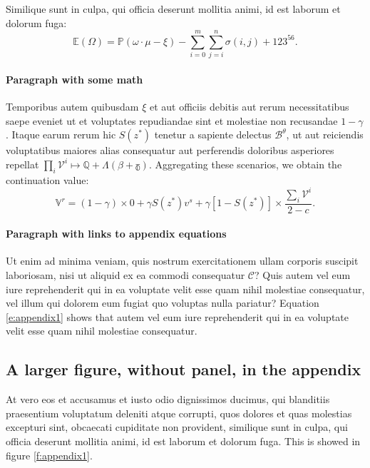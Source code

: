 \documentclass[letterpaper,12pt,leqno]{article}
\begin{document}
\begin{corollary} Similique sunt in culpa, qui officia deserunt mollitia animi, id est laborum et dolorum fuga:
\begin{equation*}
\mathbb{E}(\Omega) = \mathbb{P}(\omega\cdot \mu - \xi) - \sum_{i=0}^{m}\sum_{j=i}^{n} \sigma(i,j) + 123^{56}.
\end{equation*}\end{corollary}

\paragraph{Paragraph with some math} Temporibus autem quibusdam $\xi$ et aut officiis debitis aut rerum necessitatibus saepe eveniet ut et voluptates repudiandae sint et molestiae non recusandae $1-\gamma$. Itaque earum rerum hic $S(z^*)$ tenetur a sapiente delectus $\mathcal{B}^\theta$, ut aut reiciendis voluptatibus maiores alias consequatur aut perferendis doloribus asperiores repellat $\prod_i\mathcal{V}^i \mapsto \mathbb{Q} + \mathbb{\Lambda(\beta + \gamma)}$. Aggregating these scenarios, we obtain the continuation value:
\begin{equation}
\mathbb{V}^r = (1-\gamma) \times 0 +\gamma S(z^*) v^s+\gamma [1-S(z^*)] \times \frac{\sum_i\mathcal{V}^i}{2-c}.
\label{e:appendix1}\end{equation}

\paragraph{Paragraph with links to appendix equations} Ut enim ad minima veniam, quis nostrum exercitationem ullam corporis suscipit laboriosam, nisi ut aliquid ex ea commodi consequatur $\mathcal{C}$? Quis autem vel eum iure reprehenderit qui in ea voluptate velit esse quam nihil molestiae consequatur, vel illum qui dolorem eum fugiat quo voluptas nulla pariatur? Equation \eqref{e:appendix1} shows that autem vel eum iure reprehenderit qui in ea voluptate velit esse quam nihil molestiae consequatur.

\subsection{A larger figure, without panel, in the appendix} 

At vero eos et accusamus et iusto odio dignissimos ducimus, qui blanditiis praesentium voluptatum deleniti atque corrupti, quos dolores et quas molestias excepturi sint, obcaecati cupiditate non provident, similique sunt in culpa, qui officia deserunt mollitia animi, id est laborum et dolorum fuga. This is showed in figure \ref{f:appendix1}.
\end{document}
